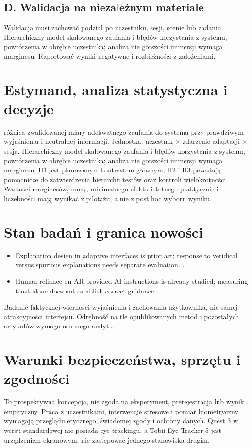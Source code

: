 \documentclass[11pt,a4paper]{article}
\begin{document}
\subsection{D. Walidacja na niezależnym materiale}
Walidacja musi zachować podział po uczestniku, sesji, scenie lub zadaniu. Hierarchiczny model skalowanego zaufania i błędów korzystania z systemu, powtórzenia w obrębie uczestnika; analiza nie gorszości immersji wymaga marginesu. Raportować wyniki negatywne i rozbieżności z założeniami.
\section{Estymand, analiza statystyczna i decyzje}
różnica zwalidowanej miary adekwatnego zaufania do systemu przy prawdziwym wyjaśnieniu i neutralnej informacji. Jednostka: uczestnik × zdarzenie adaptacji × sesja. Hierarchiczny model skalowanego zaufania i błędów korzystania z systemu, powtórzenia w obrębie uczestnika; analiza nie gorszości immersji wymaga marginesu. H1 jest planowanym kontrastem głównym; H2 i H3 pozostają pomocnicze do zatwierdzenia hierarchii testów oraz kontroli wielokrotności. Wartości marginesów, mocy, minimalnego efektu istotnego praktycznie i liczebności mają wynikać z pilotażu, a nie z post hoc wyboru wyniku.
\section{Stan badań i granica nowości}
\begin{itemize}
\item Explanation design in adaptive interfaces is prior art; response to veridical versus spurious explanations needs separate evaluation. \cite{xrprior1}.
\item Human reliance on AR-provided AI instructions is already studied; measuring trust alone does not establish correct guidance. \cite{xrprior2}.
\end{itemize}
Badanie faktycznej wierności wyjaśnienia i zachowania użytkownika, nie samej atrakcyjności interfejsu. Odrębność na tle opublikowanych metod i pozostałych artykułów wymaga osobnego audytu.
\section{Warunki bezpieczeństwa, sprzętu i zgodności}
To prospektywna koncepcja, nie zgoda na eksperyment, prerejestracja lub wynik empiryczny. Praca z uczestnikami, interwencje stresowe i pomiar biometryczny wymagają przeglądu etycznego, świadomej zgody i ochrony danych. Quest 3 w wersji standardowej nie posiada eye trackingu, a Tobii Eye Tracker 5 jest urządzeniem ekranowym; nie zastępować jednego stanowiska drugim.
\end{document}
